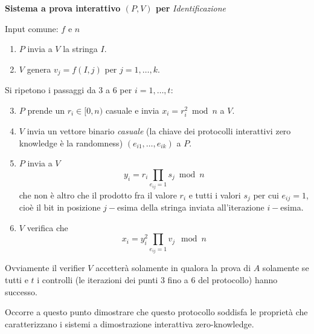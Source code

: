 \documentclass{article}
\theoremstyle{definition}
\begin{document}
\begin{mdframed}
\begin{center}
    \vspace{10pt}
    \textbf{Sistema a prova interattivo $(P, V)$ per} \textit{Identificazione}
    \vspace{10pt}
\end{center} 
Input comune: $f$ e $n$
\begin{enumerate}
    \item $P$ invia a $V$ la stringa $I$. 
    \item $V$ genera $v_j = f(I, j)$ per $j = 1, \dots, k$.  
\end{enumerate}
Si ripetono i passaggi da 3 a 6 per $i = 1, \dots, t$:
\begin{enumerate}
    \setcounter{enumi}{2}
    \item $P$ prende un $r_i \in [0, n)$ casuale e invia $x_i = r_i^2 \bmod n$ a $V$.
    \item $V$ invia un vettore binario \emph{casuale} (la chiave dei protocolli interattivi zero knowledge è la randomness) $(e_{i1}, \dots, e_{ik})$ a $P$.
    \item $P$ invia a $V$ 
    \begin{equation}\label{eq:fiat_shamir_yi}
        y_i = r_i \prod_{e_{ij}=1} s_j \bmod n
    \end{equation}
    che non è altro che il prodotto fra il valore $r_i$ e tutti i valori $s_j$ per cui $e_{ij} = 1$, cioè il bit in posizione $j-$esima della stringa inviata all'iterazione $i-$esima.
    \item $V$ verifica che 
    \begin{equation}\label{eq:fiat_shamir_verifica}
        x_i = y_i^2 \prod_{e_{ij} = 1} v_j \mod n
    \end{equation}
\end{enumerate}
\end{mdframed}

Ovviamente il verifier $V$ accetterà solamente in qualora la prova di $A$ solamente se tutti e $t$ i controlli (le iterazioni dei punti 3 fino a 6 del protocollo) hanno successo.

Occorre a questo punto dimostrare che questo protocollo soddisfa le proprietà che caratterizzano i sistemi a dimostrazione interattiva zero-knowledge.
\end{document}
